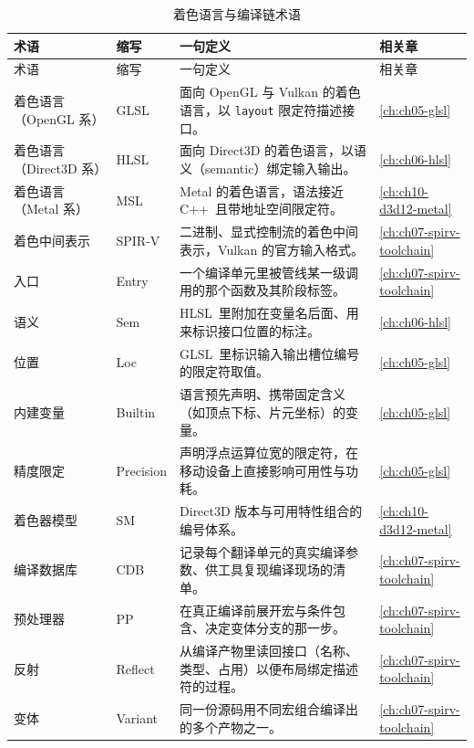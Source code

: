 \documentclass[12pt,a4paper,fontset=fandol]{ctexbook}
\newcommand{\Tp}[1]{\texttt{#1}}
\newcommand{\Lang}[1]{\textsf{#1}}
\newcommand{\CPP}{\Lang{C++}}
\newcommand{\GSL}{\Lang{GLSL}}
\newcommand{\HSL}{\Lang{HLSL}}
\newcommand{\MSL}{\Lang{MSL}}
\newcommand{\SPIV}{\Lang{SPIR-V}}
\begin{document}
\begin{longtable}{>{\raggedright\arraybackslash}p{}
                  >{\raggedright\arraybackslash\small}p{}
                  >{\raggedright\arraybackslash}p{}
                  >{\raggedright\arraybackslash}p{}}
\caption{着色语言与编译链术语}\label{tab:apA-lang} \\
\toprule
术语 & 缩写 & 一句定义 & 相关章 \\
\midrule
\endfirsthead
\toprule
术语 & 缩写 & 一句定义 & 相关章 \\
\midrule
\endhead
\bottomrule
\endfoot
着色语言（OpenGL 系） & \GSL & 面向 OpenGL 与 Vulkan 的着色语言，以 \Tp{layout} 限定符描述接口。 & \ref{ch:ch05-glsl} \\
着色语言（Direct3D 系） & \HSL & 面向 Direct3D 的着色语言，以语义（semantic）绑定输入输出。 & \ref{ch:ch06-hlsl} \\
着色语言（Metal 系） & \MSL & Metal 的着色语言，语法接近 \CPP\ 且带地址空间限定符。 & \ref{ch:ch10-d3d12-metal} \\
着色中间表示 & \SPIV & 二进制、显式控制流的着色中间表示，Vulkan 的官方输入格式。 & \ref{ch:ch07-spirv-toolchain} \\
入口 & Entry & 一个编译单元里被管线某一级调用的那个函数及其阶段标签。 & \ref{ch:ch07-spirv-toolchain} \\
语义 & Sem & \HSL\ 里附加在变量名后面、用来标识接口位置的标注。 & \ref{ch:ch06-hlsl} \\
位置 & Loc & \GSL\ 里标识输入输出槽位编号的限定符取值。 & \ref{ch:ch05-glsl} \\
内建变量 & Builtin & 语言预先声明、携带固定含义（如顶点下标、片元坐标）的变量。 & \ref{ch:ch05-glsl} \\
精度限定 & Precision & 声明浮点运算位宽的限定符，在移动设备上直接影响可用性与功耗。 & \ref{ch:ch05-glsl} \\
着色器模型 & SM & Direct3D 版本与可用特性组合的编号体系。 & \ref{ch:ch10-d3d12-metal} \\
编译数据库 & CDB & 记录每个翻译单元的真实编译参数、供工具复现编译现场的清单。 & \ref{ch:ch07-spirv-toolchain} \\
预处理器 & PP & 在真正编译前展开宏与条件包含、决定变体分支的那一步。 & \ref{ch:ch07-spirv-toolchain} \\
反射 & Reflect & 从编译产物里读回接口（名称、类型、占用）以便布局绑定描述符的过程。 & \ref{ch:ch07-spirv-toolchain} \\
变体 & Variant & 同一份源码用不同宏组合编译出的多个产物之一。 & \ref{ch:ch07-spirv-toolchain} \\

\end{longtable}
\end{document}
